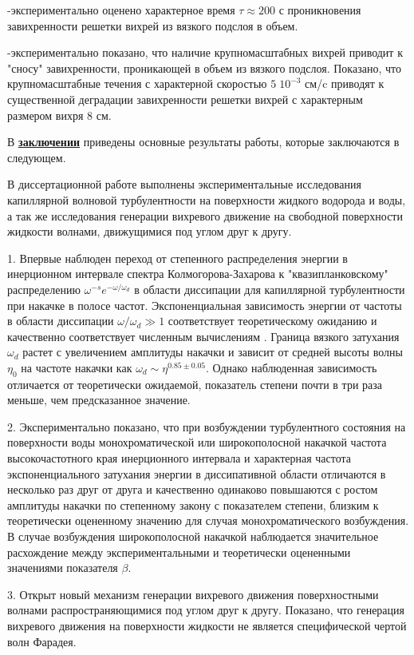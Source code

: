 -экспериментально оценено характерное время $\tau \approx 200$ с проникновения завихренности решетки вихрей из вязкого подслоя в объем. 

-экспериментально показано, что наличие крупномасштабных вихрей приводит к "сносу"{} завихренности, проникающей в объем из вязкого подслоя. Показано, что крупномасштабные течения с характерной скоростью $5 \; 10^{-3}$ см/c приводят к существенной деградации завихренности решетки вихрей с характерным размером вихря 8 см.


В \underline{\textbf{заключении}} приведены основные результаты работы, которые заключаются в следующем.

В диссертационной работе выполнены экспериментальные исследования капиллярной волновой турбулентности на поверхности жидкого водорода и воды, а так же исследования генерации вихревого движение на свободной поверхности жидкости волнами, движущимися под углом друг к другу.

1. Впервые наблюден переход от степенного распределения энергии в инерционном интервале спектра Колмогорова-Захарова к "квазипланковскому"{} распределению $\omega^{-s}e^{-\omega/\omega_d}$ в области диссипации для капиллярной турбулентности при накачке в полосе частот. Экспоненциальная зависимость энергии от частоты в области диссипации $\omega/\omega_d \gg 1$ соответствует теоретическому ожиданию и качественно соответствует численным вычислениям \cite{Ryzhenkova1990}. Граница вязкого затухания $\omega_d$ растет с увеличением амплитуды накачки и зависит от средней высоты волны $\eta_0$ на частоте накачки как $\omega_d \sim \eta^{0.85 \pm 0.05}$. Однако наблюденная зависимость отличается от теоретически ожидаемой, показатель степени почти в три раза меньше, чем предсказанное значение.

2. Экспериментально показано, что при возбуждении турбулентного состояния на поверхности воды монохроматической или широкополосной накачкой частота высокочастотного края инерционного интервала и характерная частота экспоненциального затухания энергии в диссипативной области отличаются в несколько раз друг от друга и качественно одинаково повышаются с ростом амплитуды накачки по степенному закону с показателем степени, близким к теоретически оцененному значению для случая монохроматического возбуждения. В случае возбуждения широкополосной накачкой наблюдается значительное расхождение между экспериментальными и теоретически оцененными значениями показателя $\beta$.

3. Открыт новый механизм генерации вихревого движения поверхностными волнами распространяющимися под углом друг к другу. Показано, что генерация вихревого движения на поверхности жидкости не является специфической чертой волн Фарадея.

